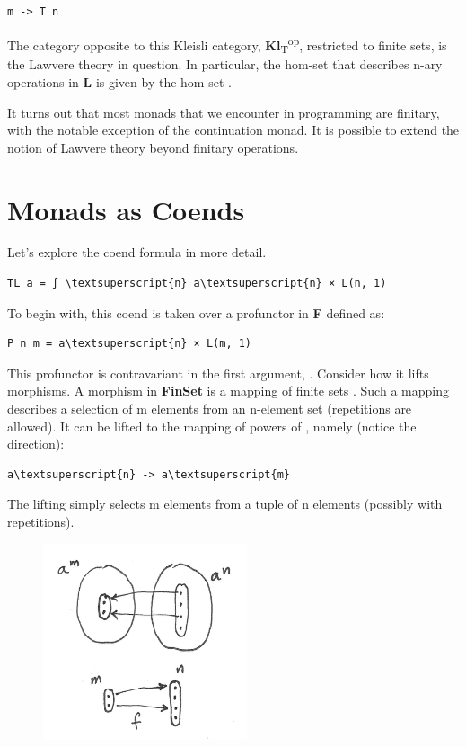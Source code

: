 \begin{Verbatim}[commandchars=\\\{\}]
m -> T n
\end{Verbatim}
The category opposite to this Kleisli category,
\textbf{Kl}\textsubscript{T}\textsuperscript{op}, restricted to finite
sets, is the Lawvere theory in question. In particular, the hom-set
 that describes n-ary operations in \textbf{L} is given
by the hom-set .

It turns out that most monads that we encounter in programming are
finitary, with the notable exception of the continuation monad. It is
possible to extend the notion of Lawvere theory beyond finitary
operations.

\section{Monads as Coends}\label{monads-as-coends}

Let's explore the coend formula in more detail.

\begin{Verbatim}[commandchars=\\\{\}]
TL a = ∫ \textsuperscript{n} a\textsuperscript{n} × L(n, 1)
\end{Verbatim}
To begin with, this coend is taken over a profunctor  in
\textbf{F} defined as:

\begin{Verbatim}[commandchars=\\\{\}]
P n m = a\textsuperscript{n} × L(m, 1)
\end{Verbatim}
This profunctor is contravariant in the first argument, .
Consider how it lifts morphisms. A morphism in \textbf{FinSet} is a
mapping of finite sets . Such a
mapping describes a selection of m elements from an n-element set
(repetitions are allowed). It can be lifted to the mapping of powers of
, namely (notice the direction):

\begin{Verbatim}[commandchars=\\\{\}]
a\textsuperscript{n} -> a\textsuperscript{m}
\end{Verbatim}
The lifting simply selects m elements from a tuple of n elements
 (possibly with repetitions).

\begin{figure}[H]
\centering
\includegraphics[width=60mm]{images/liftpower.png}
\end{figure}

